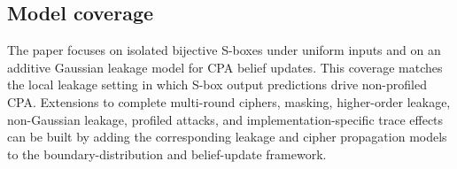 \subsection{Model coverage}\label{subsec:scope}

The paper focuses on isolated bijective S-boxes under uniform inputs and on an
additive Gaussian leakage model for CPA belief updates.  This coverage matches
the local leakage setting in which S-box output predictions drive non-profiled
CPA.  Extensions to complete multi-round ciphers, masking, higher-order
leakage, non-Gaussian leakage, profiled attacks, and implementation-specific
trace effects can be built by adding the corresponding leakage and cipher
propagation models to the boundary-distribution and belief-update framework.
